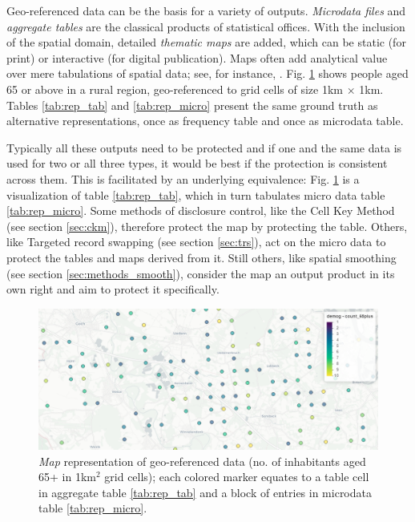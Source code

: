 Geo-referenced data can be the basis for a variety of outputs. \emph{Microdata files} and \emph{aggregate tables} 
are the classical products of statistical offices.
With the inclusion of the spatial domain, detailed \emph{thematic maps} are added, which can be static (for print) or interactive (for digital publication). Maps often add analytical value over mere tabulations of spatial data; see, for instance, \citet{Waller2024}.
Fig. \ref{fig:rep_map} shows people aged 65 or above in a rural region, geo-referenced to grid cells of size 1km $\times$ 1km. Tables \ref{tab:rep_tab} and \ref{tab:rep_micro} present the same ground truth as alternative representations, once as frequency table and once as microdata table.

Typically all these outputs need to be protected and if one and the same data is used for two or all three types, it would be best if the protection is consistent across them. This is facilitated by an underlying equivalence: Fig. \ref{fig:rep_map} is a visualization of table \ref{tab:rep_tab}, which in turn tabulates micro data table \ref{tab:rep_micro}.
Some methods of disclosure control, like the Cell Key Method (see section \ref{sec:ckm}), therefore protect the map by protecting the table. Others, like Targeted record swapping (see section \ref{sec:trs}), act on the micro data to protect the tables and maps derived from it. Still others, like spatial smoothing (see section \ref{sec:methods_smooth}), consider the map an output product in its own right and aim to protect it specifically.

\newpage

\begin{figure}[H]
    \centering
    \includegraphics[width=\linewidth]{figures/rep_map.png}
    \caption{\emph{Map} representation of geo-referenced data (no. of inhabitants aged 65+ in 1km$^2$ grid cells); each colored marker equates to a table cell in aggregate table \ref{tab:rep_tab} and a block of entries in microdata table \ref{tab:rep_micro}.}
    \label{fig:rep_map}
\end{figure}

